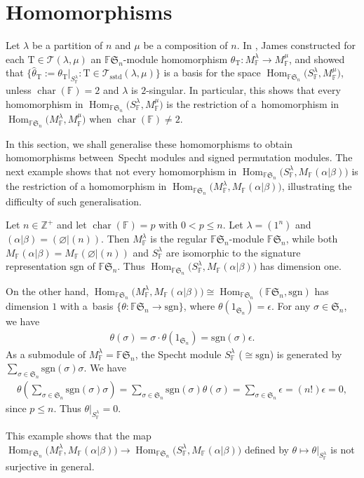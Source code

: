 \documentclass[pdftex]{sigma}
\newcommand{\TT}{\mathscr{T}}
\newcommand{\TTS}{\mathscr{T}_\mathrm{sstd}}
\newcommand{\T}{\mathrm{T}}
\newcommand{\sgn}{\mathrm{sgn}}
\newcommand{\Char}{\operatorname{\mathrm{char}}}
\newcommand{\Hom}{\operatorname{Hom}}
\newcommand{\sym}[1]{\mathfrak{S}_{#1}}
\newcommand{\F}{\mathbb{F}}
\begin{document}
\section{Homomorphisms}\label{S:sstd hom}

Let $\lambda$ be a partition of $n$ and $\mu$ be a composition of $n$. In \cite[Section~13]{GJ}, James constructed for each $\T \in \TT(\lambda,\mu)$ an $\F\sym{n}$-module homomorphism $\theta_\T \colon M_\F^{\lambda} \to M_\F^{\mu}$, and showed that $\{ \hat{\theta}_{\T} := \theta_{\T}|_{S_\F^{\lambda}}\colon \T \in \TTS(\lambda,\mu) \}$ is a basis for the space $\Hom_{\F\sym{n}}\big(S_\F^{\lambda},M_\F^{\mu}\big)$, unless $\Char(\F)=2$ and $\lambda$ is $2$-singular. In particular, this shows that every homomorphism in $\Hom_{\F\sym{n}}\big(S_\F^{\lambda},M_\F^{\mu}\big)$ is the restriction of a~homomorphism in $\Hom_{\F\sym{n}}\big(M_\F^{\lambda},M_\F^{\mu}\big)$ when $\Char(\F)\neq 2$.

In this section, we shall generalise these homomorphisms to obtain homomorphisms between~Specht modules and signed permutation modules. The next example shows that not every homomor\-phism in $\Hom_{\F\sym{n}}\big(S_\F^{\lambda},M_\F(\alpha|\beta)\big)$ is the restriction of a homomorphism in \linebreak $\Hom_{\F\sym{n}}\big(M_\F^{\lambda},M_\F(\alpha|\beta)\big)$, illustrating the difficulty of such generalisation.

\begin{Example}\label{Eg: James res}
Let $n\in \mathbb{Z}^+$ and let $\Char(\F)=p$ with $0 < p \leq n$. Let $\lambda=(1^n)$ and $(\alpha|\beta)=(\varnothing|(n))$. Then $M_\F^\lambda$ is the regular $\F\sym{n}$-module $\F\sym{n}$, while both $M_\F(\alpha|\beta)=M_\F(\varnothing|(n))$ and $S_\F^\lambda$ are isomorphic to the signature representation $\sgn$ of $\F\sym{n}$. Thus $\Hom_{\F\sym{n}}\big(S_\F^\lambda,M_\F(\alpha|\beta)\big)$ has dimension one.

On the other hand, $\Hom_{\F\sym{n}}\big(M_\F^\lambda,M_\F(\alpha|\beta)\big) \cong \Hom_{\F\sym{n}}(\F\sym{n},\sgn)$ has dimension $1$ with a~basis $\{\theta\colon \F\sym{n} \to \sgn \}$, where $\theta(1_{\sym{n}})=\epsilon$. For any $\sigma\in \sym{n}$, we have
\begin{gather*}
\theta(\sigma)=\sigma \cdot \theta(1_{\sym{n}})=\sgn(\sigma) \epsilon.
\end{gather*}
As a submodule of $M_\F^{\lambda} = \F\sym{n}$, the Specht module $S_\F^{\lambda}$ ($\cong \sgn$) is generated by $\sum\limits_{\sigma \in \sym{n}} \sgn(\sigma) \sigma$. We have
\begin{gather*}
\theta\left (\sum_{\sigma\in\sym{n}}\sgn(\sigma)\sigma\right )=\sum_{\sigma\in\sym{n}}\sgn(\sigma)\theta(\sigma)=\sum_{\sigma\in\sym{n}} \epsilon = (n!) \epsilon = 0,
\end{gather*}
since $p \leq n$. Thus $\theta|_{S_\F^\lambda} = 0$.

This example shows that the map $\Hom_{\F\sym{n}} \big(M_\F^{\lambda}, M_\F(\alpha|\beta)\big) \to \Hom_{\F\sym{n}} \big(S_\F^{\lambda}, M_\F(\alpha|\beta)\big)$ defined by $\theta \mapsto \theta|_{S_\F^{\lambda}}$ is not surjective in general.
\end{Example}
\end{document}
